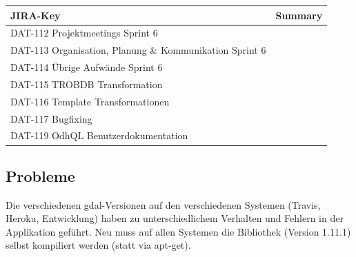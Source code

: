 \begin{table}[H]	
\centering
\begin{tabular}{ll}
	\toprule
	\textbf{JIRA-Key} & \textbf{Summary}\\
	\midrule
DAT-112	Projektmeetings Sprint 6\\
DAT-113	Organisation, Planung \& Kommunikation Sprint 6\\
DAT-114	Übrige Aufwände Sprint 6\\
DAT-115	TROBDB Transformation\\
DAT-116	Template Transformationen\\
DAT-117	Bugfixing\\
DAT-119	OdhQL Benutzerdokumentation\\
	\bottomrule
\end{tabular}	
\end{table}

\subsection*{Probleme}
Die verschiedenen \acs{gdal}-Versionen auf den verschiedenen Systemen (Travis, Heroku, Entwicklung) haben zu unterschiedlichem Verhalten und Fehlern in der Applikation geführt. Neu muss auf allen Systemen die Bibliothek (Version 1.11.1) selbst kompiliert werden (statt via apt-get).
